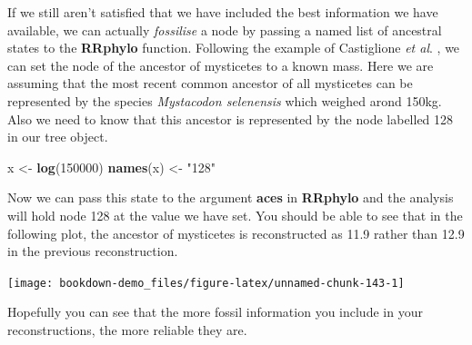 \documentclass[
]{book}
\newenvironment{Shaded}{\begin{snugshade}}{\end{snugshade}}
\newcommand{\DataTypeTok}[1]{\textcolor[rgb]{0.13,0.29,0.53}{#1}}
\newcommand{\DecValTok}[1]{\textcolor[rgb]{0.00,0.00,0.81}{#1}}
\newcommand{\FloatTok}[1]{\textcolor[rgb]{0.00,0.00,0.81}{#1}}
\newcommand{\KeywordTok}[1]{\textcolor[rgb]{0.13,0.29,0.53}{\textbf{#1}}}
\newcommand{\NormalTok}[1]{#1}
\newcommand{\OperatorTok}[1]{\textcolor[rgb]{0.81,0.36,0.00}{\textbf{#1}}}
\newcommand{\OtherTok}[1]{\textcolor[rgb]{0.56,0.35,0.01}{#1}}
\newcommand{\StringTok}[1]{\textcolor[rgb]{0.31,0.60,0.02}{#1}}
\begin{document}
If we still aren't satisfied that we have included the best information we have available, we can actually \emph{fossilise} a node by passing a named list of ancestral states to the \textbf{RRphylo} function. Following the example of Castiglione \emph{et al}. \citeyearpar{Castiglione20}, we can set the node of the ancestor of mysticetes to a known mass. Here we are assuming that the most recent common ancestor of all mysticetes can be represented by the species \emph{Mystacodon selenensis} which weighed arond 150kg. Also we need to know that this ancestor is represented by the node labelled 128 in our tree object.

\begin{Shaded}
\begin{Highlighting}[]
\NormalTok{x \textless{}{-}}\StringTok{ }\KeywordTok{log}\NormalTok{(}\DecValTok{150000}\NormalTok{)}
\KeywordTok{names}\NormalTok{(x) \textless{}{-}}\StringTok{ "128"}
\end{Highlighting}
\end{Shaded}

Now we can pass this state to the argument \textbf{aces} in \textbf{RRphylo} and the analysis will hold node 128 at the value we have set. You should be able to see that in the following plot, the ancestor of mysticetes is reconstructed as 11.9 rather than 12.9 in the previous reconstruction.

\begin{Shaded}
\end{Shaded}

\begin{center}\texttt{[image: bookdown-demo\_files/figure-latex/unnamed-chunk-143-1]} \end{center}

Hopefully you can see that the more fossil information you include in your reconstructions, the more reliable they are.
\end{document}
